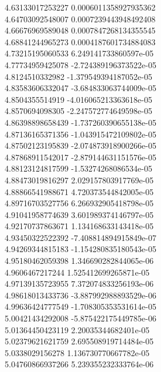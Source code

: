 {4.63133017253227 0.0006011358927935362 \\
4.64703092548007 0.0007239443948492408 \\
4.66676969589048 0.0007847268134355545 \\
4.68841244965273 0.0004187601734884083 \\
4.73215195060533 6.249141733860597e-05 \\
4.77734959425078 -2.724389196373522e-05 \\
4.8124510332982 -1.379549394187052e-05 \\
4.83583606332047 -3.684833063744009e-05 \\
4.8504355514919 -4.016065213363618e-05 \\
4.8570694098305 -2.247572774649598e-05 \\
4.86398898658439 -1.737260390655138e-05 \\
4.87136165371356 -1.043915472109802e-05 \\
4.87502123195839 -2.074873918900266e-05 \\
4.87868911542017 -2.879144631151576e-05 \\
4.88123124817599 -1.53274268086534e-05 \\
4.88473019816297 2.029157803917769e-05 \\
4.88866541988671 4.720373544842005e-05 \\
4.89716703527756 6.266932905418798e-05 \\
4.91041958774639 3.601989374146797e-05 \\
4.92170737863671 1.134168633143418e-05 \\
4.93450322522392 -7.408814894915849e-07 \\
4.94269344815183 -1.154280835180543e-05 \\
4.95180462059398 1.346690282844065e-06 \\
4.9606467217244 1.525412699265871e-05 \\
4.97139135723955 7.372074833256193e-06 \\
4.98618013433736 -3.887992988893529e-06 \\
4.99636424777549 -1.708305353531614e-05 \\
5.00421434292008 -5.875422175449785e-06 \\
5.01364450423119 2.20035344682401e-05 \\
5.02379621621759 2.695508919714484e-05 \\
5.0338029156278 1.136730770667782e-05 \\
5.04760866937266 5.239355232333764e-06 \\
}
